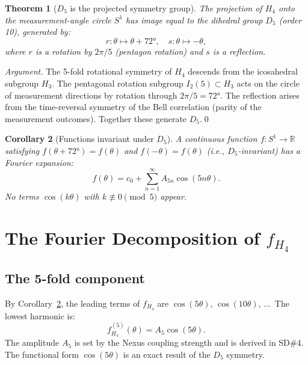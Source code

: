 \documentclass[11pt,a4paper]{article}
\newtheorem{theorem}{Theorem}[section]
\newtheorem{corollary}[theorem]{Corollary}
\begin{document}
\begin{theorem}[$D_5$ is the projected symmetry group]
\label{thm:D5}
The projection of $H_4$ onto the measurement-angle circle $S^1$
has image equal to the dihedral group $D_5$ (order 10), generated by:
\begin{equation}
r: \theta \mapsto \theta + 72°, \quad
s: \theta \mapsto -\theta,
\label{eq:D5_generators}
\end{equation}
where $r$ is a rotation by $2\pi/5$ (pentagon rotation) and $s$ is
a reflection.
\end{theorem}

\begin{proof}[Argument]
The 5-fold rotational symmetry of $H_4$ descends from the icosahedral
subgroup $H_3$.  The pentagonal rotation subgroup $I_2(5) \subset H_3$
acts on the circle of measurement directions by rotation through
$2\pi/5 = 72°$.  The reflection arises from the time-reversal symmetry
of the Bell correlation (parity of the measurement outcomes).
Together these generate $D_5$.\qed
\end{proof}

\begin{corollary}[Functions invariant under $D_5$]
\label{cor:D5_functions}
A continuous function $f: S^1 \to \mathbb{R}$ satisfying $f(\theta +
72°) = f(\theta)$ and $f(-\theta) = f(\theta)$ (i.e., $D_5$-invariant)
has a Fourier expansion:
\begin{equation}
f(\theta) = c_0 + \sum_{n=1}^{\infty} A_{5n}\cos(5n\theta).
\label{eq:D5_fourier}
\end{equation}
No terms $\cos(k\theta)$ with $k \not\equiv 0 \pmod{5}$ appear.
\end{corollary}

\section{The Fourier Decomposition of $f_{H_4}$}

\subsection{The 5-fold component}

By Corollary~\ref{cor:D5_functions}, the leading terms of $f_{H_4}$
are $\cos(5\theta)$, $\cos(10\theta)$, $\ldots$\ The lowest harmonic
is:
\begin{equation}
f_{H_4}^{(5)}(\theta) = A_5\cos(5\theta).
\label{eq:f5}
\end{equation}
The amplitude $A_5$ is set by the Nexus coupling strength and is
derived in SD\#4.  The functional form $\cos(5\theta)$ is an
exact result of the $D_5$ symmetry.
\end{document}
